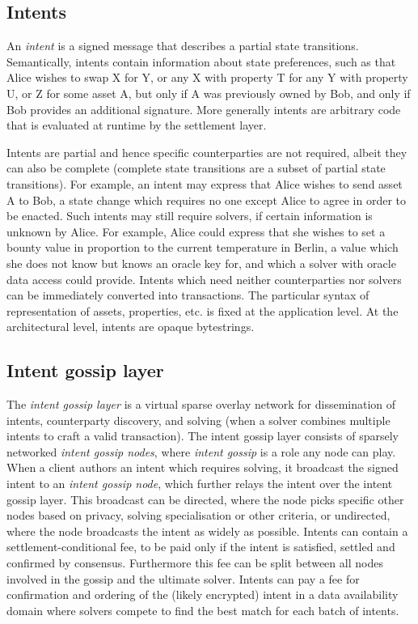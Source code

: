 \documentclass[
    9pt,            %
    commun,        %
    affiltop,       %
]{art}
\begin{document}
\subsection{Intents}\label{intents}

An \emph{intent} is a signed message that describes a partial state
transitions. Semantically, intents contain information about state
preferences, such as that Alice wishes to swap X for Y, or any X with
property T for any Y with property U, or Z for some asset A, but only if
A was previously owned by Bob, and only if Bob provides an additional
signature. More generally intents are arbitrary code that is evaluated
at runtime by the settlement layer.

Intents are partial and hence specific counterparties are not required,
albeit they can also be complete (complete state transitions are a
subset of partial state transitions). For example, an intent may express
that Alice wishes to send asset A to Bob, a state change which requires
no one except Alice to agree in order to be enacted. Such intents may
still require solvers, if certain information is unknown by Alice. For
example, Alice could express that she wishes to set a bounty value in
proportion to the current temperature in Berlin, a value which she does
not know but knows an oracle key for, and which a solver with oracle
data access could provide. Intents which need neither counterparties nor
solvers can be immediately converted into transactions. The particular
syntax of representation of assets, properties, etc. is fixed at the
application level. At the architectural level, intents are opaque
bytestrings.

\subsection{Intent gossip layer}\label{intent-gossip-layer}

The \emph{intent gossip layer} is a virtual sparse overlay network for
dissemination of intents, counterparty discovery, and solving (when a
solver combines multiple intents to craft a valid transaction). The
intent gossip layer consists of sparsely networked \emph{intent gossip
nodes}, where \emph{intent gossip} is a role any node can play. When a
client authors an intent which requires solving, it broadcast the signed
intent to an \emph{intent gossip node}, which further relays the intent
over the intent gossip layer. This broadcast can be directed, where the
node picks specific other nodes based on privacy, solving specialisation
or other criteria, or undirected, where the node broadcasts the intent
as widely as possible. Intents can contain a settlement-conditional fee,
to be paid only if the intent is satisfied, settled and confirmed by
consensus. Furthermore this fee can be split between all nodes involved
in the gossip and the ultimate solver. Intents can pay a fee for
confirmation and ordering of the (likely encrypted) intent in a data
availability domain where solvers compete to find the best match for
each batch of intents.
\end{document}
